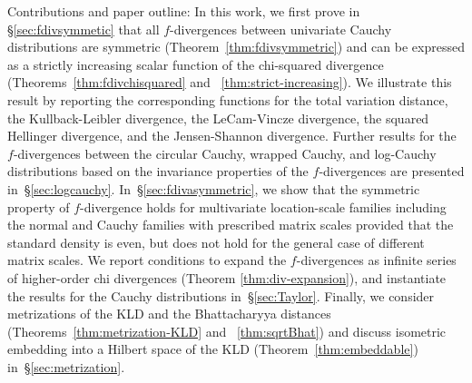 \documentclass[journal]{IEEEtran}
\begin{document}
Contributions and paper outline: 
In this work, we first prove in \S\ref{sec:fdivsymmetic} that all $f$-divergences between univariate Cauchy distributions 
are symmetric (Theorem~\ref{thm:fdivsymmetric}) and can be expressed as a strictly increasing scalar function of the chi-squared divergence (Theorems~\ref{thm:fdivchisquared} and ~\ref{thm:strict-increasing}). 
We illustrate this result by reporting the corresponding functions for the total variation distance, the Kullback-Leibler divergence, 
the LeCam-Vincze divergence, the squared Hellinger divergence, and the Jensen-Shannon divergence.
Further results for the $f$-divergences between the circular Cauchy, wrapped Cauchy, and log-Cauchy distributions based on the invariance properties of 
the $f$-divergences are presented in~\S\ref{sec:logcauchy}. 
In~\S\ref{sec:fdivasymmetric}, we show that the symmetric property of $f$-divergence holds for multivariate location-scale families including the normal and Cauchy families with prescribed matrix scales provided that the standard density is even, but does not hold for the general case of different matrix scales. 
We report conditions to expand the $f$-divergences as infinite series of higher-order chi divergences (Theorem \ref{thm:div-expansion}), and instantiate the results for the Cauchy distributions in~\S\ref{sec:Taylor}.
Finally, we consider metrizations of the KLD and the Bhattacharyya distances (Theorems~\ref{thm:metrization-KLD} and ~\ref{thm:sqrtBhat}) and discuss isometric embedding into a Hilbert space of the KLD (Theorem~\ref{thm:embeddable}) in~\S\ref{sec:metrization}.

% 
% 
% 
% 

 
\end{document}
